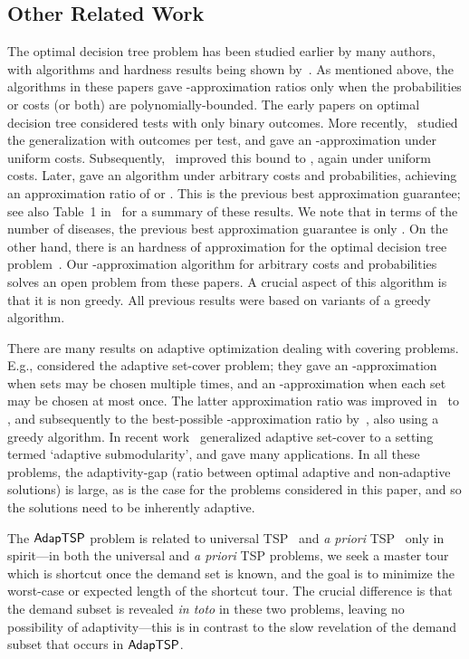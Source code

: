 \documentclass[11pt]{article}
\def\stsp{\ensuremath{{\sf AdapTSP}}\xspace}
\def\dtp{optimal decision tree problem\xspace}
\begin{document}
\subsection{Other Related Work}
The \dtp has been studied earlier by many authors, with algorithms and hardness results being shown
by~\cite{garey-graham,rivest-hyafil,loveland,kmb,AH12,dasgupta,CPRAM11,cprs09,gb09}. As mentioned above, the algorithms
in these papers gave -approximation ratios only when the probabilities or costs (or both) are
polynomially-bounded. The early papers on optimal decision tree considered tests with only binary outcomes.
More recently,~\cite{CPRAM11} studied the generalization with  outcomes per test, and gave an -approximation under uniform costs. Subsequently,~\cite{cprs09} improved this bound to ,
again under uniform costs. Later, \cite{gb09} gave an algorithm under arbitrary costs and
probabilities, achieving an approximation ratio of  or . This is the previous best approximation guarantee; see also Table~1
in~\cite{gb09} for a summary of these results. We note that in terms of the number  of diseases, the previous best approximation guarantee is only . On the other hand, there is an  hardness of approximation for the
\dtp~\cite{CPRAM11}. Our -approximation algorithm for arbitrary costs and probabilities solves an open problem from
these papers. A crucial aspect of this algorithm is that it is   non greedy. All previous results were based on
variants of a greedy algorithm.

There are many results on adaptive optimization dealing with covering problems. E.g., \cite{goemansv06} considered the adaptive set-cover problem; they
gave an -approximation when sets may be chosen multiple times, and an -approximation when each set may
be chosen at most once. The latter approximation ratio was improved in~\cite{msw07} to , and subsequently to the
best-possible -approximation ratio by~\cite{lpry08}, also using a greedy algorithm.  In recent
work~\cite{GK11} generalized adaptive set-cover to a setting termed `adaptive submodularity', and gave many
applications.  In all these problems, the adaptivity-gap  (ratio between optimal adaptive and non-adaptive solutions) is large, as is the case for the problems considered in this paper, and so the solutions
need to be inherently adaptive.



The \stsp problem is related to universal TSP~\cite{jlnrs,ghr} and {\em
  a priori} TSP~\cite{jaillet,ss08,st08} only in spirit---in both the
universal and \emph{a priori} TSP problems, we seek a master tour which is shortcut once the demand set is known, and
the goal is to minimize the worst-case or expected length of the shortcut tour. The crucial difference is that the
demand subset is revealed {\em in toto} in these two problems, leaving no possibility of adaptivity---this is in
contrast to the slow revelation of the demand subset that occurs in \stsp.
\end{document}
